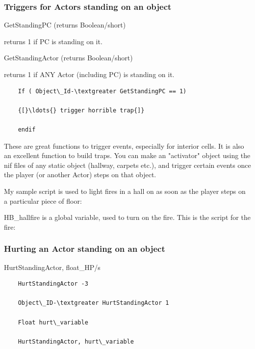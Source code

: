 \hypertarget{triggers-for-actors-standing-on-an-object}{%
\subsubsection{Triggers for Actors standing on an
object}\label{triggers-for-actors-standing-on-an-object}}

GetStandingPC (returns Boolean/short)

returns 1 if PC is standing on it.

GetStandingActor (returns Boolean/short)

returns 1 if ANY Actor (including PC) is standing on it.

\begin{lstlisting}
	If ( Object\_Id-\textgreater GetStandingPC == 1)
	
	{[}\ldots{} trigger horrible trap{]}
	
	endif
\end{lstlisting}

These are great functions to trigger events, especially for interior
cells. It is also an excellent function to build traps. You can make an
"activator" object using the nif files of any static object (hallway,
carpets etc.), and trigger certain events once the player (or another
Actor) steps on that object.

My sample script is used to light fires in a hall on as soon as the
player steps on a particular piece of floor:



HB\_hallfire is a global variable, used to turn on the fire. This is the
script for the fire:



\hypertarget{hurting-an-actor-standing-on-an-object}{%
\subsubsection{Hurting an Actor standing on an
object}\label{hurting-an-actor-standing-on-an-object}}

HurtStandingActor, float\_HP/s

\begin{lstlisting}
	HurtStandingActor -3
	
	Object\_ID-\textgreater HurtStandingActor 1
	
	Float hurt\_variable
	
	HurtStandingActor, hurt\_variable
\end{lstlisting}

